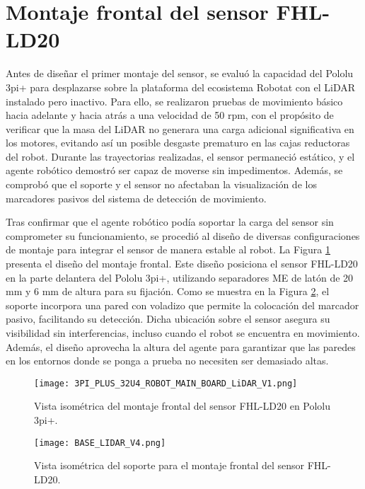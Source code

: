 \section{Montaje frontal del sensor FHL-LD20}
Antes de diseñar el primer montaje del sensor, se evaluó la capacidad del Pololu 3pi+ para desplazarse sobre la plataforma del ecosistema Robotat con el LiDAR instalado pero inactivo. Para ello, se realizaron pruebas de movimiento básico hacia adelante y hacia atrás a una velocidad de 50 rpm, con el propósito de verificar que la masa del LiDAR no generara una carga adicional significativa en los motores, evitando así un posible desgaste prematuro en las cajas reductoras del robot. Durante las trayectorias realizadas, el sensor permaneció estático, y el agente robótico demostró ser capaz de moverse sin impedimentos. Además, se comprobó que el soporte y el sensor no afectaban la visualización de los marcadores pasivos del sistema de detección de movimiento.

Tras confirmar que el agente robótico podía soportar la carga del sensor sin comprometer su funcionamiento, se procedió al diseño de diversas configuraciones de montaje para integrar el sensor de manera estable al robot. La Figura \ref{fig:montaje1} presenta el diseño del montaje frontal. Este diseño posiciona el sensor FHL-LD20 en la parte delantera del Pololu 3pi+, utilizando separadores ME de latón de 20 mm y 6 mm de altura para su fijación. Como se muestra en la Figura \ref{fig:base1}, el soporte incorpora una pared con voladizo que permite la colocación del marcador pasivo, facilitando su detección. Dicha ubicación sobre el sensor asegura su visibilidad sin interferencias, incluso cuando el robot se encuentra en movimiento. Además, el diseño aprovecha la altura del agente para garantizar que las paredes en los entornos donde se ponga a prueba no necesiten ser demasiado altas.

\begin{figure}[H]
	\centering
	\texttt{[image: 3PI\_PLUS\_32U4\_ROBOT\_MAIN\_BOARD\_LiDAR\_V1.png]}
	\caption{Vista isométrica del montaje frontal del sensor FHL-LD20 en Pololu 3pi+.}
	\label{fig:montaje1}
\end{figure}

\begin{figure}[H]
	\centering
	\texttt{[image: BASE\_LIDAR\_V4.png]}
	\caption{Vista isométrica del soporte para el montaje frontal del sensor FHL-LD20.}
	\label{fig:base1}
\end{figure}

